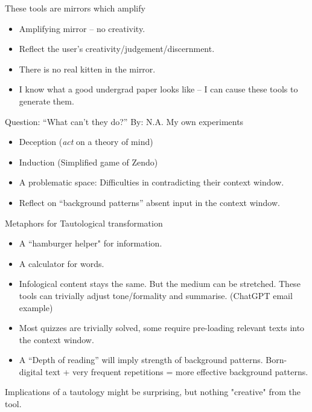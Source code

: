 \documentclass[aspectratio=169]{beamer}
\newcommand{\clearbackground}[0]{\setbeamertemplate{background}{}}
\begin{document}
\clearbackground{}
\begin{frame}{These tools are mirrors which amplify}


\begin{itemize}
    \item Amplifying mirror -- no creativity.
    \item Reflect the user's creativity/judgement/discernment.
    \item There is no real kitten in the mirror.
    \item I know what a good undergrad paper looks like -- I can cause these tools to generate them.
\end{itemize}

     
\end{frame}
\begin{frame}{Question: ``What can't they do?'' By: N.A.}
My own experiments
  \begin{itemize}
      \item Deception (\textit{act} on a theory of mind)
      \item Induction (Simplified game of Zendo)
      \item A problematic space: Difficulties in contradicting their context window.
      \item Reflect on ``background patterns'' absent input in the context window. 
  \end{itemize}


\end{frame}
\begin{frame}{Metaphors for Tautological transformation}
\begin{itemize}
    \item A ``hamburger helper" for information. 
    \item A calculator for words. \parencite{Willison2023-nf}
    \item Infological content stays the same. But the medium can be stretched. These tools can trivially adjust tone/formality and summarise. (ChatGPT email example)
    \item Most quizzes are trivially solved, some require pre-loading relevant texts into the context window.
    \item A ``Depth of reading'' will imply strength of background patterns. Born-digital text + very frequent repetitions = more effective background patterns.
\end{itemize}

\vspace{1em}

{\Large Implications of a tautology might be surprising, but nothing "creative" from the tool.}
    
\end{frame}
\end{document}

